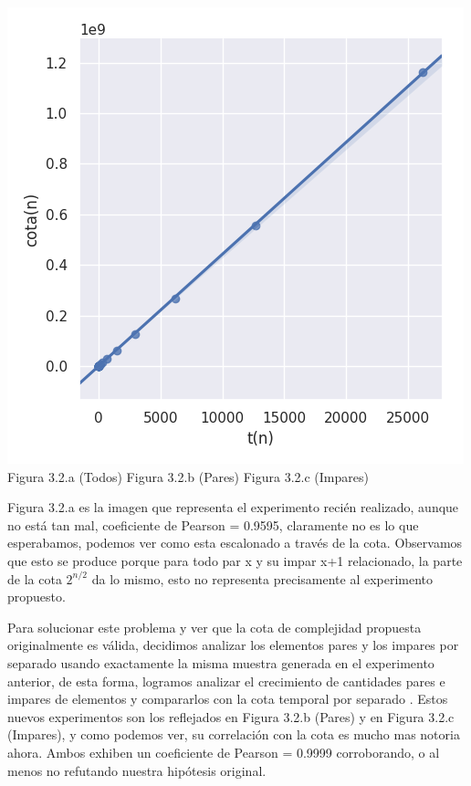 \documentclass[a4paper]{article}
\begin{document}
\begin{center}
	\includegraphics[scale=0.415]{mitmImparesPeor.png}
	Figura 3.2.a (Todos)   \quad\quad\quad\quad\quad\quad   Figura 3.2.b (Pares) \quad\quad\quad\quad\quad Figura 3.2.c (Impares)
\end{center}

Figura 3.2.a es la imagen que representa el experimento recién realizado, aunque no está tan mal, coeficiente de Pearson = 0.9595, claramente no es lo que esperabamos, podemos ver como esta escalonado a través de la cota. Observamos que esto se produce porque para todo par x y su impar x+1 relacionado, la parte de la cota $2^{n/2}$ da lo mismo, esto no representa precisamente al experimento propuesto.

Para solucionar este problema y ver que la cota de complejidad propuesta originalmente es válida, decidimos analizar los elementos pares y los impares por separado usando exactamente la misma muestra generada en el experimento anterior, de esta forma, logramos analizar el crecimiento de cantidades pares e impares de elementos y compararlos con la cota temporal por separado . Estos nuevos experimentos son los reflejados en Figura 3.2.b (Pares) y en Figura 3.2.c (Impares), y como podemos ver, su correlación con la cota es mucho mas notoria ahora. Ambos exhiben un coeficiente de Pearson = 0.9999 corroborando, o al menos no refutando nuestra hipótesis original.
\end{document}
